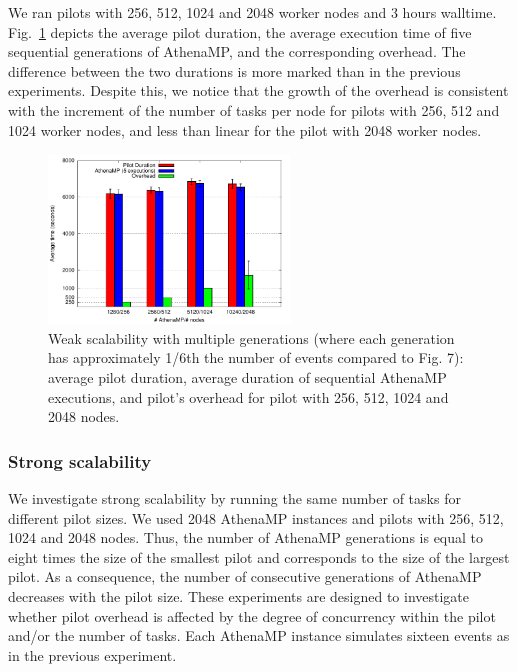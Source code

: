 We ran pilots with 256, 512, 1024 and 2048 worker nodes and 3 hours walltime.
Fig.~\ref{fig:weakScal2a} depicts the average pilot duration, the average
execution time of five sequential generations of AthenaMP, and the
corresponding overhead. The difference between the two durations is more
marked than in the previous experiments. Despite this, we notice that the
growth of the overhead is consistent with the increment of the number of tasks
per node for pilots with 256, 512 and 1024 worker nodes, and less than linear
for the pilot with 2048 worker nodes.

\begin{figure}[!t]
    \includegraphics[height=4.5cm,width=\columnwidth]{./figures/NGE/weak2.pdf}
    \vspace{-0.3in}
    \caption{Weak scalability with multiple generations (where each
    generation has approximately 1/6th the number of events compared to Fig.
    7): average pilot duration, average duration of sequential AthenaMP
    executions, and pilot's overhead for pilot with 256, 512, 1024 and 2048
    nodes.}\label{fig:weakScal2a}
\end{figure}


\subsubsection{Strong scalability}

We investigate strong scalability by running the same number of tasks for
different pilot sizes. We used 2048 AthenaMP instances and pilots with 256,
512, 1024 and 2048 nodes. Thus, the number of AthenaMP generations is equal
to eight times the size of the smallest pilot and corresponds to the size of
the largest pilot. As a consequence, the number of consecutive generations of
AthenaMP decreases with the pilot size. These experiments are designed to
investigate whether pilot overhead is affected by the degree of concurrency
within the pilot and/or the number of tasks. Each AthenaMP instance simulates
sixteen events as in the previous experiment.

